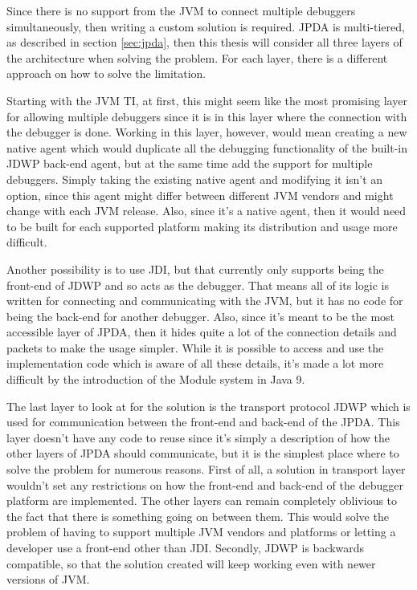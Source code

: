\documentclass[..thesis.tex]{subfiles}
\begin{document}
Since there is no support from the JVM to connect multiple debuggers simultaneously, then writing a custom solution is required. 
JPDA is multi-tiered, as described in section \ref{sec:jpda}, then this thesis will consider all three layers of the architecture when solving the problem.
For each layer, there is a different approach on how to solve the limitation.

Starting with the JVM TI, at first, this might seem like the most promising layer for allowing multiple debuggers since it is in this layer where the connection with the debugger is done.
Working in this layer, however, would mean creating a new native agent which would duplicate all the debugging functionality of the built-in JDWP back-end agent, but at the same time add the support for multiple debuggers.
Simply taking the existing native agent and modifying it isn't an option, since this agent might differ between different JVM vendors and might change with each JVM release.
Also, since it's a native agent, then it would need to be built for each supported platform making its distribution and usage more difficult.

Another possibility is to use JDI, but that currently only supports being the front-end of JDWP and so acts as the debugger.
That means all of its logic is written for connecting and communicating with the JVM, but it has no code for being the back-end for another debugger.
Also, since it's meant to be the most accessible layer of JPDA, then it hides quite a lot of the connection details and packets to make the usage simpler.
While it is possible to access and use the implementation code which is aware of all these details, it's made a lot more difficult by the introduction of the Module system in Java 9.

The last layer to look at for the solution is the transport protocol JDWP which is used for communication between the front-end and back-end of the JPDA.
This layer doesn't have any code to reuse since it's simply a description of how the other layers of JPDA should communicate, but it is the simplest place where to solve the problem for numerous reasons.
First of all, a solution in transport layer wouldn't set any restrictions on how the front-end and back-end of the debugger platform are implemented.
The other layers can remain completely oblivious to the fact that there is something going on between them.
This would solve the problem of having to support multiple JVM vendors and platforms or letting a developer use a front-end other than JDI.
Secondly, JDWP is backwards compatible, so that the solution created will keep working even with newer versions of JVM.
\end{document}
